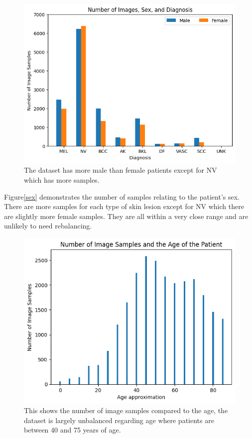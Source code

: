 \begin{figure}
    \centering
    \includegraphics[scale=0.75]{images/ISIC/number-sex-diagnosis.png}
    \caption{The dataset has more male than female patients except for NV which has more samples.} 
\end{figure} \label{sex}

Figure\ref{sex} demonstrates the number of samples relating to the patient's sex. There are more samples for each type of skin lesion except for NV which there are slightly more female samples. They are all within a very close range and are unlikely to need rebalancing.

\begin{figure}
    \centering
    \includegraphics[scale=0.75]{images/ISIC/age-number.png}
    \caption{This shows the number of image samples compared to the age, the dataset is largely unbalanced regarding age where patients are between 40 and 75 years of age.}
\end{figure} \label{age-number}

